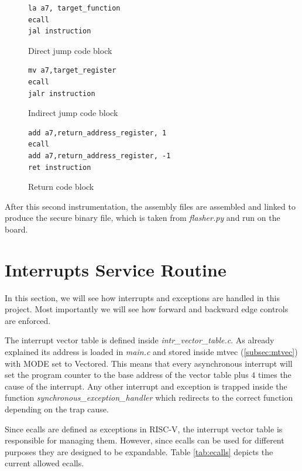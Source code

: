 \begin{figure}[htbp]
  \centering
  \begin{lstlisting}[style=Assembly]
la a7, target_function
ecall
jal instruction
\end{lstlisting}
  \caption{Direct jump code block}
  \label{fig:dirjumpblock}
\end{figure}

\begin{figure}[htbp]
  \centering
  \begin{lstlisting}[style=Assembly]
mv a7,target_register
ecall
jalr instruction
 \end{lstlisting}
  \caption{Indirect jump code block}
  \label{fig:indirjumpblock}
\end{figure}

\begin{figure}[htbp]
  \centering
  \begin{lstlisting}[style=Assembly]
add a7,return_address_register, 1
ecall
add a7,return_address_register, -1
ret instruction
 \end{lstlisting}
  \caption{Return code block}
  \label{fig:retblock}
\end{figure}

After this second instrumentation, the assembly files are assembled and linked to
produce the secure binary file, which is taken from \textit{flasher.py} and run on
the board.

\section{Interrupts Service Routine}
\label{sec:project_isr}

In this section, we will see how interrupts and exceptions are handled in this project.
Most importantly we will see how forward and backward edge controls are enforced.

The interrupt vector table is defined inside \textit{intr\_vector\_table.c}. As
already explained its address is loaded in \textit{main.c} and stored inside mtvec
(\ref{subsec:mtvec}) with MODE set to Vectored. This means that every
asynchronous interrupt will set the program counter to the base address of the
vector table plus $4$ times the cause of the interrupt. Any other interrupt and exception
is trapped inside the function \textit{synchronous\_exception\_handler} which
redirects to the correct function depending on the trap cause.

Since ecalls are defined as exceptions in RISC-V, the interrupt vector table is responsible
for managing them. However, since ecalls can be used for different purposes they
are designed to be expandable. Table \ref{tab:ecalls} depicts the current
allowed ecalls.

